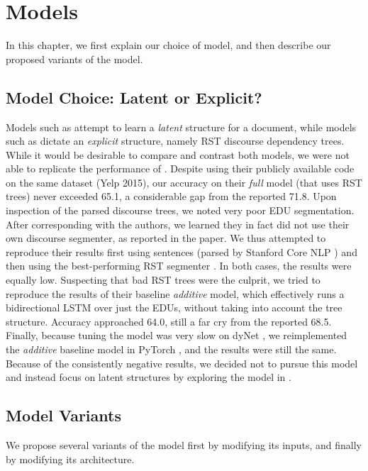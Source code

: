 \section{Models}
In this chapter, we first explain our choice of model, and then describe our proposed variants of the  model.

\subsection{Model Choice: Latent or Explicit?}
Models such as  attempt to learn a \emph{latent} structure for a document, while models such as  dictate an \emph{explicit} structure, namely RST discourse dependency trees. While it would be desirable to compare and contrast both models, we were not able to replicate the performance of . Despite using their publicly available code on the same dataset (Yelp 2015), our accuracy on their \emph{full} model (that uses RST trees) never exceeded 65.1, a considerable gap from the reported 71.8. Upon inspection of the parsed discourse trees, we noted very poor EDU segmentation. After corresponding with the authors, we learned they in fact did not use their own discourse segmenter, as reported in the paper. We thus attempted to reproduce their results first using sentences (parsed by Stanford Core NLP \cite{Manning:2014}) and then using the best-performing RST segmenter \cite{Feng:2014}. In both cases, the results were equally low. Suspecting that bad RST trees were the culprit, we tried to reproduce the results of their baseline \emph{additive} model, which effectively runs a bidirectional LSTM over just the EDUs, without taking into account the tree structure. Accuracy approached 64.0, still a far cry from the reported 68.5.  Finally, because tuning the model was very slow on dyNet \cite{dynet}, we reimplemented the \emph{additive} baseline model in PyTorch \cite{pytorch}, and the results were still the same. Because of the consistently negative results, we decided not to pursue this model and instead focus on latent structures by exploring the model in . 

\subsection{Model Variants}
We propose several variants of the  model  first by modifying its inputs, and finally by modifying its architecture.

